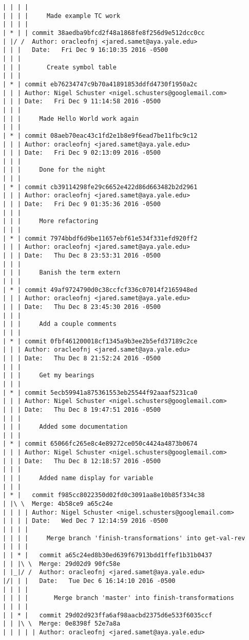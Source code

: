 \begin{lstlisting}
| | | | 
| | | |     Made example TC work
| | | |     
| * | | commit 38aedba9bfcd2f48a1868fe8f256d9e512dcc0cc
| |/ /  Author: oracleofnj <jared.samet@aya.yale.edu>
| | |   Date:   Fri Dec 9 16:10:35 2016 -0500
| | |   
| | |       Create symbol table
| | |    
| * | commit eb76234747c9b70a41891853ddfd4730f1950a2c
| | | Author: Nigel Schuster <nigel.schusters@googlemail.com>
| | | Date:   Fri Dec 9 11:14:58 2016 -0500
| | | 
| | |     Made Hello World work again
| | |    
| * | commit 08aeb70eac43c1fd2e1b8e9f6ead7be11fbc9c12
| | | Author: oracleofnj <jared.samet@aya.yale.edu>
| | | Date:   Fri Dec 9 02:13:09 2016 -0500
| | | 
| | |     Done for the night
| | |    
| * | commit cb39114298fe29c6652e422d86d663482b2d2961
| | | Author: oracleofnj <jared.samet@aya.yale.edu>
| | | Date:   Fri Dec 9 01:35:36 2016 -0500
| | | 
| | |     More refactoring
| | |    
| * | commit 7974bbdf6d9be11657ebf61e534f331efd920ff2
| | | Author: oracleofnj <jared.samet@aya.yale.edu>
| | | Date:   Thu Dec 8 23:53:31 2016 -0500
| | | 
| | |     Banish the term extern
| | |    
| * | commit 49af9724790d0c38ccfcf336c07014f2165948ed
| | | Author: oracleofnj <jared.samet@aya.yale.edu>
| | | Date:   Thu Dec 8 23:45:30 2016 -0500
| | | 
| | |     Add a couple comments
| | |    
| * | commit 0fbf461200018cf1345a9b3ee2b5efd37189c2ce
| | | Author: oracleofnj <jared.samet@aya.yale.edu>
| | | Date:   Thu Dec 8 21:52:24 2016 -0500
| | | 
| | |     Get my bearings
| | |    
| * | commit 5ecb59941a875361553eb25544f92aaaf5231ca0
| | | Author: Nigel Schuster <nigel.schusters@googlemail.com>
| | | Date:   Thu Dec 8 19:47:51 2016 -0500
| | | 
| | |     Added some documentation
| | |    
| * | commit 65066fc265e8c4e89272ce050c4424a4873b0674
| | | Author: Nigel Schuster <nigel.schusters@googlemail.com>
| | | Date:   Thu Dec 8 12:18:57 2016 -0500
| | | 
| | |     Added name display for variable
| | |      
| * |   commit f985cc8022350d02fd0c3091aa8e10b85f334c38
| |\ \  Merge: 4b58ce9 a65c24e
| | | | Author: Nigel Schuster <nigel.schusters@googlemail.com>
| | | | Date:   Wed Dec 7 12:14:59 2016 -0500
| | | | 
| | | |     Merge branch 'finish-transformations' into get-val-rev
| | | |       
| | * |   commit a65c24ed8b30ed639f67913bdd1ffef1b31b0437
| | |\ \  Merge: 29d02d9 90fc58e
| |_|/ /  Author: oracleofnj <jared.samet@aya.yale.edu>
|/| | |   Date:   Tue Dec 6 16:14:10 2016 -0500
| | | |   
| | | |       Merge branch 'master' into finish-transformations
| | | |       
| | * |   commit 29d02d923ffa6af98aacbd2375d6e533f6035ccf
| | |\ \  Merge: 0e8398f 52e7a8a
| | | | | Author: oracleofnj <jared.samet@aya.yale.edu>

\end{lstlisting}
